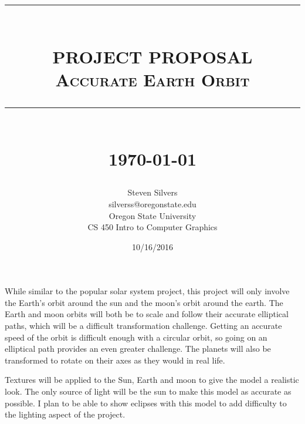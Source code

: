 \documentclass[12pt,serif,draftclsnofoot,onecolumn]{Article}
\newcommand{\HRule}[1]{\rule{\linewidth}{#1}}
\begin{document}
	\begin{titlepage}


	\title{ \normalsize \textsc{}
			\\ [2.0cm]
			\HRule{0.5pt} \\
			\LARGE \textbf{\uppercase{Project Proposal}}
			\\ \normalsize \textsc{Accurate Earth Orbit}
			\HRule{2pt} \\ [0.5cm]
			\normalsize \today \vspace*{5\baselineskip}}
	\date{10/16/2016}
	
	\author{Steven Silvers \\
			silverss@oregonstate.edu \\
			Oregon State University \\
			CS 450 Intro to Computer Graphics}
	\maketitle
	\end{titlepage}
	\newpage
	
	\par
			While similar to the popular solar system project, this project will only involve the Earth's orbit around the sun and the moon's orbit around the earth. The Earth and moon orbits will both be to scale and follow their accurate elliptical paths, which will be a difficult transformation challenge. Getting an accurate speed of the orbit is difficult enough with a circular orbit, so going on an elliptical path provides an even greater challenge. The planets will also be transformed to rotate on their axes as they would in real life.
	\newline
	\par
			Textures will be applied to the Sun, Earth and moon to give the model a realistic look. The only source of light will be the sun to make this model as accurate as possible. I plan to be able to show eclipses with this model to add difficulty to the lighting aspect of the project.
\end{document}
